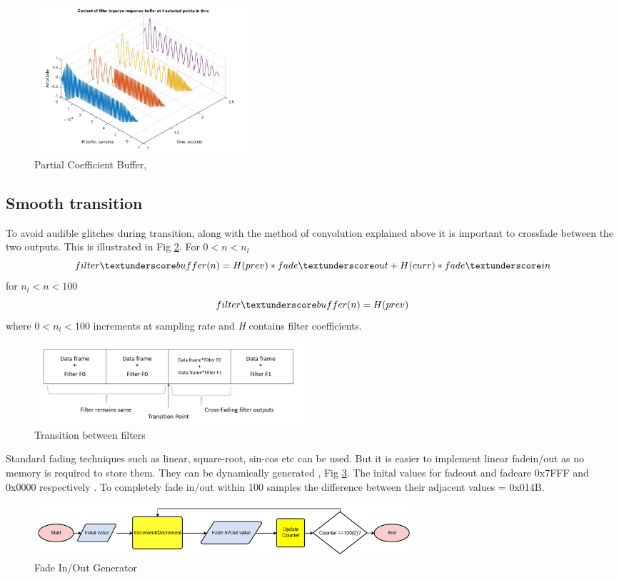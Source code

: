 \documentclass[conference]{IEEEtran}
\begin{document}
\begin{figure}
    \centering
    \includegraphics[width = 8cm]{coeffupdate.png}
    \caption{Partial Coefficient Buffer, \cite{live}}
    \label{fig:coeffupdate}
\end{figure}

\subsection{Smooth transition}
 To avoid audible glitches during transition, along with the method of convolution explained above it is important to crossfade between the two outputs. This is illustrated in Fig \ref{fig:crossfade}. 
 For $0<n<n_l$
 \begin{equation}
     filter \textunderscore buffer(n) = H(prev)*fade \textunderscore out + H(curr)*fade \textunderscore in
 \end{equation}
 for $n_l<n<100$ 
 \begin{equation}
     filter \textunderscore buffer(n) =  H(prev)
 \end{equation}
 where $0<n_l<100$ increments at sampling rate and \textit{H} contains filter coefficients.
 \begin{figure}
     \centering
     \includegraphics[width = 10cm]{Crossfade.png}
     \caption{Transition between filters}
     \label{fig:crossfade}
 \end{figure}
 
 Standard fading techniques such as linear, square-root, sin-cos etc can be used. But it is easier to implement linear fadein/out as no memory is required to store them. They can be dynamically generated , Fig \ref{fig:fadegen}. The inital values for fade\textunderscore out and  fade\textunderscore are 0x7FFF and 0x0000 respectively . To completely fade in/out within 100 samples the difference between their adjacent values = 0x014B. 
 \begin{figure}
     \centering
     \includegraphics[width = \linewidth, height = 2cm]{fade_gen.png}
     \caption{Fade In/Out Generator}
     \label{fig:fadegen}
 \end{figure}
 
\end{document}
